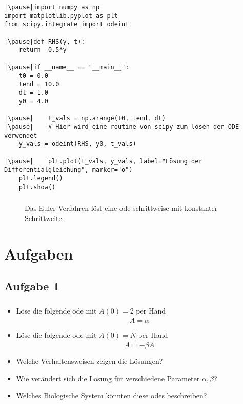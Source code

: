 \begin{frame}[fragile]
    \frametitle{\insertsubsection}
    \begin{verbatim}
|\pause|import numpy as np
import matplotlib.pyplot as plt
from scipy.integrate import odeint

|\pause|def RHS(y, t):
    return -0.5*y

|\pause|if __name__ == "__main__":
    t0 = 0.0
    tend = 10.0
    dt = 1.0
    y0 = 4.0

|\pause|    t_vals = np.arange(t0, tend, dt)
|\pause|    # Hier wird eine routine von scipy zum lösen der ODE verwendet
    y_vals = odeint(RHS, y0, t_vals)

|\pause|    plt.plot(t_vals, y_vals, label="Lösung der Differentialgleichung", marker="o")
    plt.legend()
    plt.show()
	\end{verbatim}
\end{frame}


\begin{frame}
    \frametitle{\insertsubsection}
    \begin{figure}
        \centering
        \caption{Das Euler-Verfahren löst eine \ac{ode} schrittweise mit konstanter Schrittweite.}
    \end{figure}
\end{frame}


\section{Aufgaben}
\subsection{Aufgabe 1}
\label{subsec:exercise-1}
\begin{frame}
    \frametitle{\insertsubsection}
    \begin{itemize}[<+->]
        \item Löse die folgende \ac{ode} mit $A(0)=2$ per Hand
        \[\dot{A} = \alpha\]
        \item Löse die folgende \ac{ode} mit $A(0)=N$ per Hand
        \[\dot{A} = - \beta A\]
        \item Welche Verhaltensweisen zeigen die Lösungen?
        \item Wie verändert sich die Lösung für verschiedene Parameter $\alpha, \beta$?
        \item Welches Biologische System könnten diese \acp{ode} beschreiben?
    \end{itemize}
\end{frame}


